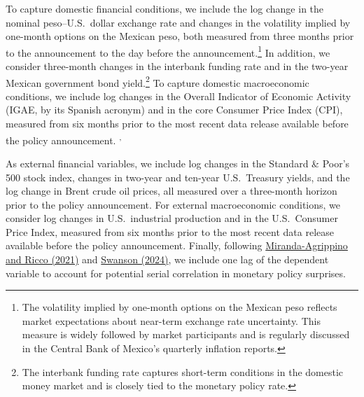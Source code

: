 \documentclass[\latexroot/\projectname]{subfiles}
\begin{document}
To capture domestic financial conditions, we include the log change in the nominal peso--U.S.\ dollar exchange rate and changes in the volatility implied by one-month options on the Mexican peso, both measured from three months prior to the announcement to the day before the announcement.\footnote{The volatility implied by one-month options on the Mexican peso reflects market expectations about near-term exchange rate uncertainty. This measure is widely followed by market participants and is regularly discussed in the Central Bank of Mexico's quarterly inflation reports.} In addition, we consider three-month changes in the interbank funding rate and in the two-year Mexican government bond yield.\footnote{The interbank funding rate captures short-term conditions in the domestic money market and is closely tied to the monetary policy rate.}  To capture domestic macroeconomic conditions, we include log changes in the Overall Indicator of Economic Activity (IGAE, by its Spanish acronym) and in the core Consumer Price Index (CPI), measured from six months prior to the most recent data release available before the policy announcement.\footnotemark
{}\textsuperscript{,}\footnotemark
{}

As external financial variables, we include log changes in the Standard \& Poor's 500 stock index, changes in two-year and ten-year U.S.\ Treasury yields, and the log change in Brent crude oil prices, all measured over a three-month horizon prior to the policy announcement. For external macroeconomic conditions, we consider log changes in U.S.\ industrial production and in the U.S.\ Consumer Price Index, measured from six months prior to the most recent data release available before the policy announcement. Finally, following \hyperlink{Miranda-Agrippino and Ricco (2021)}{Miranda-Agrippino and Ricco (2021)} and \hyperlink{Swanson (2024)}{Swanson (2024)}, we include one lag of the dependent variable to account for potential serial correlation in monetary policy surprises.
\end{document}
